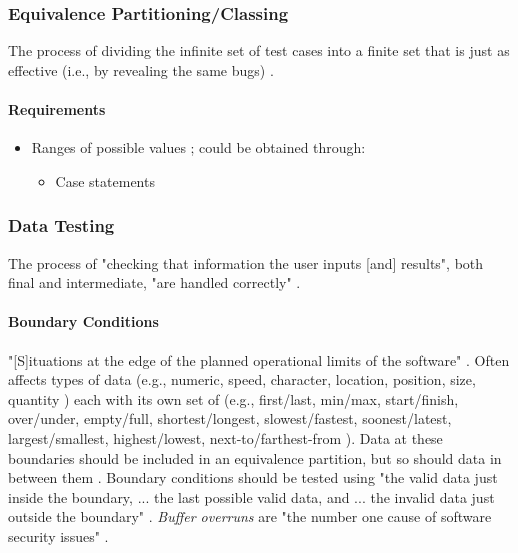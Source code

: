 \subsubsection{Equivalence Partitioning/Classing \cite[p.~67-69]{patton_software_2006}}

The process of dividing the infinite set of test cases into a finite set that is
just as effective (i.e., by revealing the same bugs) \cite[p.~67]{patton_software_2006}.

\paragraph{Requirements}
\begin{itemize}
      \item Ranges of possible values \cite[p.~67]{patton_software_2006};
            could be obtained through:
            \begin{itemize}
                  \item Case statements
            \end{itemize}
\end{itemize}

\subsubsection{Data Testing \cite[p.~70-79]{patton_software_2006}}

The process of "checking that information the user inputs [and] results",
both final and intermediate, "are handled correctly" \cite[p.~70]{patton_software_2006}.

\paragraph{Boundary Conditions \cite[p.~70-74]{patton_software_2006}}

"[S]ituations at the edge of the planned operational limits of the software"
\cite[p.~72]{patton_software_2006}. Often affects types of data (e.g., numeric,
speed, character, location, position, size, quantity
\cite[p.~72]{patton_software_2006}) each with its own set of (e.g., first/last,
min/max, start/finish, over/under, empty/full, shortest/longest,
slowest/fastest, soonest/latest, largest/smallest, highest/lowest,
next-to/farthest-from \cite[p.~72-73]{patton_software_2006}). Data at these
boundaries should be included in an equivalence partition, but so should
data in between them \cite[p.~73]{patton_software_2006}. Boundary conditions
should be tested using "the valid data just inside the boundary,
... the last possible valid data, and ... the invalid data just outside the
boundary" \cite[p.~73]{patton_software_2006}. \emph{Buffer overruns} are
"the number one cause of software security issues"
\cite[p.~75]{patton_software_2006}.


